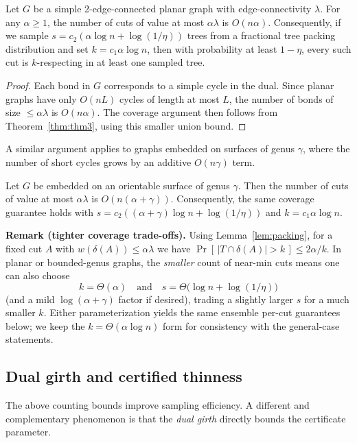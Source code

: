 \documentclass[11pt,letterpaper]{article}
\begin{document}
\begin{theorem}
\label{thm:planar-count}
Let $G$ be a simple 2-edge-connected planar graph with edge-connectivity $\lambda$.
For any $\alpha \ge 1$, the number of cuts of value at most $\alpha\lambda$ is $O(n\alpha)$.
Consequently, if we sample
$s = c_2(\alpha\log n + \log(1/\eta))$ trees from a fractional tree packing
distribution and set $k=c_1\alpha\log n$, then with probability at least $1-\eta$,
every such cut is $k$-respecting in at least one sampled tree.
\end{theorem}

\begin{proof}
Each bond in $G$ corresponds to a simple cycle in the dual.
Since planar graphs have only $O(nL)$ cycles of length at most $L$,
the number of bonds of size $\le \alpha\lambda$ is $O(n\alpha)$.
The coverage argument then follows from Theorem~\ref{thm:thm3},
using this smaller union bound.
\end{proof}

A similar argument applies to graphs embedded on surfaces of genus $\gamma$,
where the number of short cycles grows by an additive $O(n\gamma)$ term.

\begin{theorem}
\label{thm:genus-count}
Let $G$ be embedded on an orientable surface of genus $\gamma$.
Then the number of cuts of value at most $\alpha\lambda$ is $O(n(\alpha+\gamma))$.
Consequently, the same coverage guarantee holds with
$s = c_2((\alpha+\gamma)\log n + \log(1/\eta))$ and $k=c_1\alpha\log n$.
\end{theorem}

\medskip
\noindent\textbf{Remark (tighter coverage trade-offs).}
Using Lemma~\ref{lem:packing}, for a fixed cut $A$ with $w(\delta(A))\le\alpha\lambda$ we have
$\Pr[\,|T\cap\delta(A)|>k\,]\le 2\alpha/k$. In planar or bounded-genus graphs, the
\emph{smaller} count of near-min cuts means one can also choose
\[
k=\Theta(\alpha) \quad\text{and}\quad s=\Theta\big(\log n + \log(1/\eta)\big)
\]
(and a mild $\log(\alpha+\gamma)$ factor if desired), trading a slightly larger $s$ for a much smaller $k$.
Either parameterization yields the same ensemble per-cut guarantees below; we keep the
$k=\Theta(\alpha\log n)$ form for consistency with the general-case statements.

\subsection{Dual girth and certified thinness}
The above counting bounds improve sampling efficiency.
A different and complementary phenomenon is that
the \emph{dual girth} directly bounds the certificate parameter.
\end{document}
